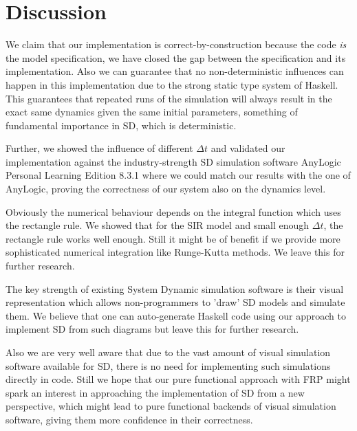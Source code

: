 \section{Discussion}
We claim that our implementation is correct-by-construction because the code \textit{is} the model specification, we have closed the gap between the specification and its implementation. Also we can guarantee that no non-deterministic influences can happen in this implementation due to the strong static type system of Haskell. This guarantees that repeated runs of the simulation will always result in the exact same dynamics given the same initial parameters, something of fundamental importance in SD, which is deterministic.


Further, we showed the influence of different $\Delta t$ and validated our implementation against the industry-strength SD simulation software AnyLogic Personal Learning Edition 8.3.1 where we could match our results with the one of AnyLogic, proving the correctness of our system also on the dynamics level.

Obviously the numerical behaviour depends on the integral function which uses the rectangle rule. We showed that for the SIR model and small enough $\Delta t$, the rectangle rule works well enough. Still it might be of benefit if we provide more sophisticated numerical integration like Runge-Kutta methods. We leave this for further research.

The key strength of existing System Dynamic simulation software is their visual representation which allows non-programmers to 'draw' SD models and simulate them. We believe that one can auto-generate Haskell code using our approach to implement SD from such diagrams but leave this for further research.

Also we are very well aware that due to the vast amount of visual simulation software available for SD, there is no need for implementing such simulations directly in code. Still we hope that our pure functional approach with FRP might spark an interest in approaching the implementation of SD from a new perspective, which might lead to pure functional backends of visual simulation software, giving them more confidence in their correctness.

